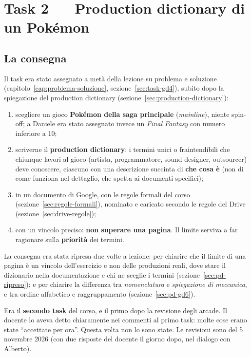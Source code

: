 \section{Task 2 --- Production dictionary di un Pokémon}
\label{rv:t2:sec:task}

\subsection{La consegna}

Il task era stato assegnato a metà della lezione su problema e soluzione
(capitolo~\ref{cap:problema-soluzione}, sezione~\ref{sec:task-gd4}), subito
dopo la spiegazione del production dictionary
(sezione~\ref{sec:production-dictionary}):
\begin{enumerate}
  \item scegliere un gioco \textbf{Pokémon della saga principale}
        (\emph{mainline}), niente spin-off; a Daniele era stato assegnato
        invece un \emph{Final Fantasy} con numero inferiore a 10;
  \item scriverne il \textbf{production dictionary}: i termini unici o
        fraintendibili che chiunque lavori al gioco (artista, programmatore,
        sound designer, outsourcer) deve conoscere, ciascuno con una
        descrizione succinta di \textbf{che cosa è} (non di come funziona nel
        dettaglio, che spetta ai documenti specifici);
  \item in un documento di Google, con le regole formali del corso
        (sezione~\ref{sec:regole-formali}), nominato e caricato secondo le
        regole del Drive (sezione~\ref{sec:drive-regole});
  \item con un vincolo preciso: \textbf{non superare una pagina}. Il limite
        serviva a far ragionare sulla \textbf{priorità} dei termini.
\end{enumerate}
La consegna era stata ripresa due volte a lezione: per chiarire che il limite
di una pagina è un vincolo dell'esercizio e non delle produzioni reali, dove
stare il dizionario nella documentazione e chi ne sceglie i termini
(sezione~\ref{sec:pd-ripreso}); e per chiarire la differenza tra
\emph{nomenclatura} e \emph{spiegazione di meccanica}, e tra ordine
alfabetico e raggruppamento (sezione~\ref{sec:pd-gd6}).

Era il \textbf{secondo task} del corso, e il primo dopo la revisione degli
arcade. Il docente lo aveva detto chiaramente nei commenti al primo task:
molte cose erano state ``accettate per ora''. Questa volta non lo sono state.
Le revisioni sono del 5 novembre 2026 (con due risposte del docente il giorno
dopo, nel dialogo con Alberto).

